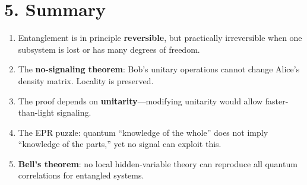 \documentclass[12pt,a4paper]{article}
\begin{document}
\section{5. Summary}

\begin{enumerate}[nosep]
    \item Entanglement is in principle \textbf{reversible}, but practically irreversible when one subsystem is lost or has many degrees of freedom.
    \item The \textbf{no-signaling theorem}: Bob's unitary operations cannot change Alice's density matrix.  Locality is preserved.
    \item The proof depends on \textbf{unitarity}---modifying unitarity would allow faster-than-light signaling.
    \item The EPR puzzle: quantum ``knowledge of the whole'' does not imply ``knowledge of the parts,'' yet no signal can exploit this.
    \item \textbf{Bell's theorem}: no local hidden-variable theory can reproduce all quantum correlations for entangled systems.
\end{enumerate}
\end{document}
